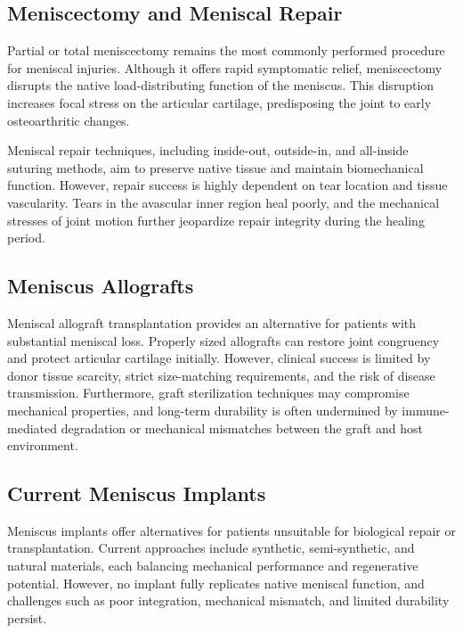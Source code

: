 \subsection{Meniscectomy and Meniscal Repair}

Partial or total meniscectomy remains the most commonly performed procedure for meniscal injuries. Although it offers rapid symptomatic relief, meniscectomy disrupts the native load-distributing function of the meniscus. This disruption increases focal stress on the articular cartilage, predisposing the joint to early osteoarthritic changes.

Meniscal repair techniques, including inside-out, outside-in, and all-inside suturing methods, aim to preserve native tissue and maintain biomechanical function. However, repair success is highly dependent on tear location and tissue vascularity. Tears in the avascular inner region heal poorly, and the mechanical stresses of joint motion further jeopardize repair integrity during the healing period.

\subsection{Meniscus Allografts}

Meniscal allograft transplantation provides an alternative for patients with substantial meniscal loss. Properly sized allografts can restore joint congruency and protect articular cartilage initially. However, clinical success is limited by donor tissue scarcity, strict size-matching requirements, and the risk of disease transmission. Furthermore, graft sterilization techniques may compromise mechanical properties, and long-term durability is often undermined by immune-mediated degradation or mechanical mismatches between the graft and host environment.

\subsection{Current Meniscus Implants}

Meniscus implants offer alternatives for patients unsuitable for biological repair or transplantation. Current approaches include synthetic, semi-synthetic, and natural materials, each balancing mechanical performance and regenerative potential. However, no implant fully replicates native meniscal function, and challenges such as poor integration, mechanical mismatch, and limited durability persist.

